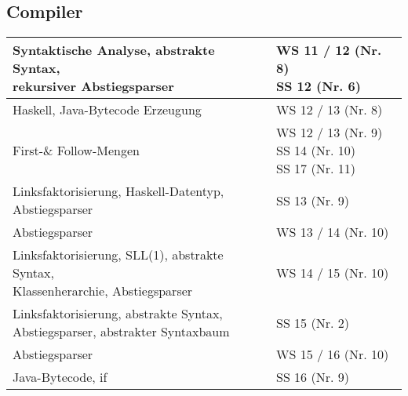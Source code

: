 \subsection*{Compiler}
\begin{table}[h]
	\centering
	\label{my-label}
	\begin{tabular}{l|l}
		\multlineTable{Syntaktische Analyse, abstrakte Syntax,\\ rekursiver Abstiegsparser}
		& \multlineTable{WS 11 / 12 (Nr. 8)\\ SS 12 (Nr. 6)} \\ \hline	
		
		Haskell, Java-Bytecode Erzeugung
		& WS 12 / 13 (Nr. 8) \\ \hline
		
		First-\& Follow-Mengen 
		& \multlineTable{WS 12 / 13 (Nr. 9)\\ SS 14 (Nr. 10)\\ SS 17 (Nr. 11)} \\ \hline	
		
		\multlineTable{Linksfaktorisierung, Haskell-Datentyp,\\ Abstiegsparser }
		& SS 13 (Nr. 9) \\ \hline
		
		Abstiegsparser 
		& WS 13 / 14 (Nr. 10) \\ \hline	
		
		\multlineTable{Linksfaktorisierung, SLL(1), abstrakte Syntax,\\ Klassenherarchie, Abstiegsparser}
		& WS 14 / 15 (Nr. 10) \\ \hline	
		
		\multlineTable{Linksfaktorisierung, abstrakte Syntax,\\ Abstiegsparser, abstrakter Syntaxbaum}
		& SS 15 (Nr. 2) \\ \hline
		
		Abstiegsparser 
		& WS 15 / 16 (Nr. 10) \\ \hline
		
		Java-Bytecode, if
		& SS 16 (Nr. 9) \\ \hline
	\end{tabular}
\end{table}
\FloatBarrier